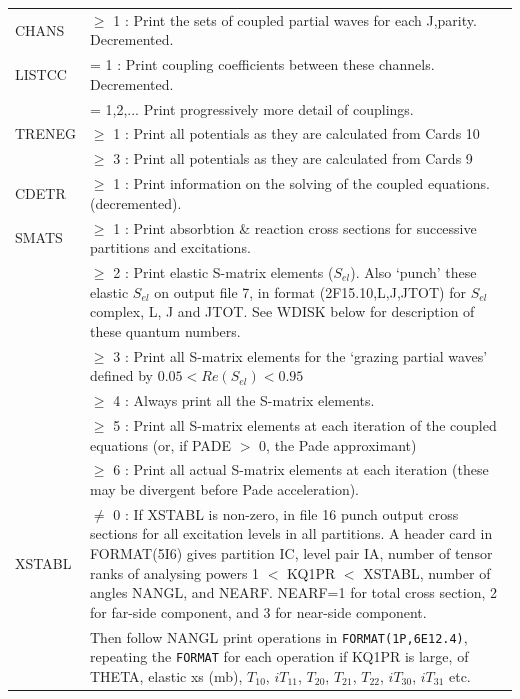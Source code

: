 \documentclass[11pt]{book}
\begin{document}
\begin{longtable}{| p{} | p{} |} 
\hline 
CHANS  & $\geq$ 1 : Print the sets of coupled partial waves for each J,parity.
Decremented. \\
LISTCC & = 1 : Print coupling coefficients between these channels. Decremented. \\
       &   = 1,2,... Print progressively more detail of couplings. \\
TRENEG & $\geq$ 1 : Print all potentials as they are calculated from Cards 10 \\
       & $\geq$ 3 : Print all potentials as they are calculated from Cards 9 \\
CDETR  &  $\geq$ 1 : Print information on the solving of the coupled equations.
(decremented). \\
\hline 
SMATS &  $\geq$ 1 : Print absorbtion \& reaction cross sections for successive
partitions and excitations.\\  
      & $\geq$ 2 : Print elastic S-matrix elements ($S_{el}$).
Also `punch' these elastic $S_{el}$ on output file 7,
in format (2F15.10,L,J,JTOT) for $S_{el}$ complex, L, J and JTOT.
See WDISK below for description of these quantum numbers. \\
      & $\geq$ 3 : Print all S-matrix elements for the `grazing partial waves'
defined by $0.05 < Re(S_{el}) < 0.95$\\  
      & $\geq$ 4 : Always print all the S-matrix elements.\\  
      & $\geq$ 5 : Print all S-matrix elements at each iteration of the coupled
equations (or, if PADE  $>$ 0, the Pade approximant)\\  
      & $\geq$ 6 : Print all actual S-matrix elements at each iteration (these
may be divergent before Pade acceleration). \\
\hline        
XSTABL & $\neq$ 0 : If XSTABL is non-zero, in file 16 punch output cross sections
for all excitation levels in all partitions.
A header card in FORMAT(5I6) gives partition IC, level pair IA,
number of tensor ranks of analysing powers 1 $<$ KQ1PR $<$ XSTABL,
number of angles NANGL, and NEARF.  NEARF=1 for total cross section,
2 for far-side component, and 3 for near-side component. \\
    & Then follow NANGL print operations in
{\tt FORMAT(1P,6E12.4)}, repeating
the {\tt FORMAT} for each operation if KQ1PR is large,
of THETA, elastic xs (mb), $T_{10}$, $iT_{11}$,
$T_{20}$, $ T_{21}$, $ T_{22}$, $ iT_{30}$, $ iT_{31}$
etc. \\
\hline 
\end{longtable}
\end{document}
